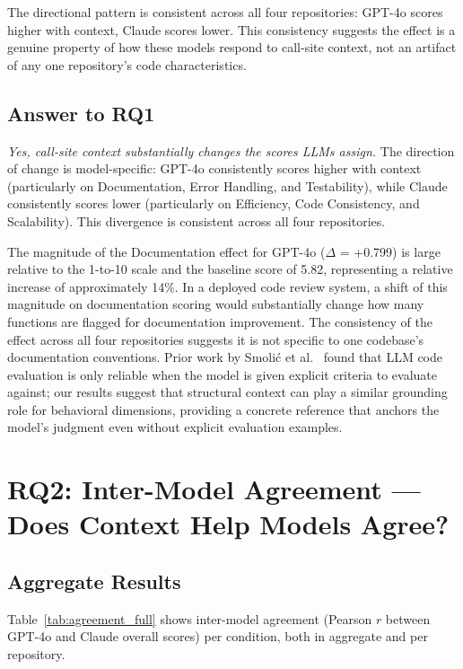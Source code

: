 \documentclass[12pt]{report}
\begin{document}
The directional pattern is consistent across all four repositories: GPT-4o scores higher with context, Claude scores lower. This consistency suggests the effect is a genuine property of how these models respond to call-site context, not an artifact of any one repository's code characteristics.

\subsection{Answer to RQ1}

\textit{Yes, call-site context substantially changes the scores LLMs assign.} The direction of change is model-specific: GPT-4o consistently scores higher with context (particularly on Documentation, Error Handling, and Testability), while Claude consistently scores lower (particularly on Efficiency, Code Consistency, and Scalability). This divergence is consistent across all four repositories.

The magnitude of the Documentation effect for GPT-4o ($\Delta$ = +0.799) is large relative to the 1-to-10 scale and the baseline score of 5.82, representing a relative increase of approximately 14\%. In a deployed code review system, a shift of this magnitude on documentation scoring would substantially change how many functions are flagged for documentation improvement. The consistency of the effect across all four repositories suggests it is not specific to one codebase's documentation conventions. Prior work by Smoli\'{c} et al.~\cite{Smolic2024MIPRO} found that LLM code evaluation is only reliable when the model is given explicit criteria to evaluate against; our results suggest that structural context can play a similar grounding role for behavioral dimensions, providing a concrete reference that anchors the model's judgment even without explicit evaluation examples.

\section{RQ2: Inter-Model Agreement --- Does Context Help Models Agree?}

\subsection{Aggregate Results}

Table~\ref{tab:agreement_full} shows inter-model agreement (Pearson $r$ between GPT-4o and Claude overall scores) per condition, both in aggregate and per repository.
\end{document}
